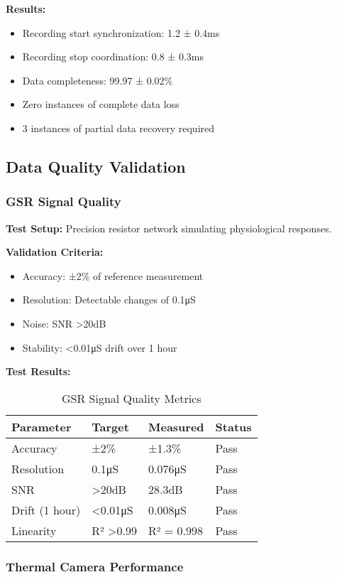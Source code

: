 \textbf{Results:}
\begin{itemize}
\item Recording start synchronization: 1.2 ± 0.4ms
\item Recording stop coordination: 0.8 ± 0.3ms
\item Data completeness: 99.97 ± 0.02\%
\item Zero instances of complete data loss
\item 3 instances of partial data recovery required
\end{itemize}

\subsection{Data Quality Validation}

\subsubsection{GSR Signal Quality}

\textbf{Test Setup:} Precision resistor network simulating physiological responses.

\textbf{Validation Criteria:}
\begin{itemize}
\item Accuracy: ±2\% of reference measurement
\item Resolution: Detectable changes of 0.1μS
\item Noise: SNR >20dB
\item Stability: <0.01μS drift over 1 hour
\end{itemize}

\textbf{Test Results:}
\begin{table}[htbp]
\centering
\caption{GSR Signal Quality Metrics}
\begin{tabular}{|l|l|l|l|}
\hline
\textbf{Parameter} & \textbf{Target} & \textbf{Measured} & \textbf{Status} \\
\hline
Accuracy & ±2\% & ±1.3\% & Pass \\
Resolution & 0.1μS & 0.076μS & Pass \\
SNR & >20dB & 28.3dB & Pass \\
Drift (1 hour) & <0.01μS & 0.008μS & Pass \\
Linearity & R² >0.99 & R² = 0.998 & Pass \\
\hline
\end{tabular}
\end{table}

\subsubsection{Thermal Camera Performance}

